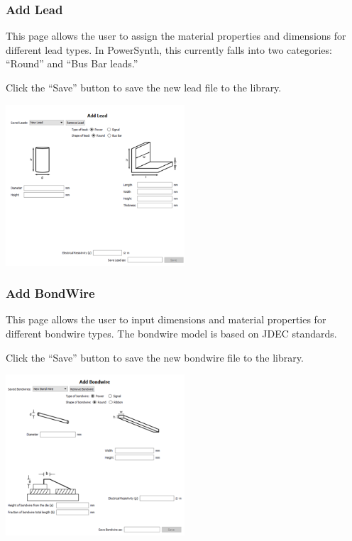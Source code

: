 \documentclass[11pt]{article}
\begin{document}
\subsubsection{Add Lead}
\label{sec-3-1-3}

This page  allows the user to assign the material properties and dimensions for different lead types. In PowerSynth, this currently falls into two categories: “Round” and “Bus Bar leads.”

Click the “Save” button to save the new lead file to the library.

\begin{center}
\includegraphics[width=0.5\textwidth]{./figs/35_TL-Lead.png}
\end{center}


\subsubsection{Add BondWire}
\label{sec-3-1-4}

This page allows the user to input dimensions and material properties for different bondwire types. The bondwire model is based on JDEC standards.

Click the “Save” button to save the new bondwire file to the library.

\begin{center}
\includegraphics[width=0.5\textwidth]{./figs/36_TL-BW.png}
\end{center}
\end{document}
